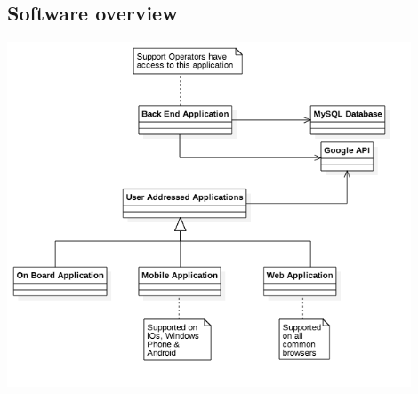 \documentclass[12pt]{article}
\begin{document}
	\subsection{Software overview}
	  \begin{center}
 	 	\includegraphics[width=0.9\textwidth ,height=0.9\textwidth ,center]{Images/SoftwareDistribution.png}
	 \end{center}
	 
	 
	 	
\end{document}
